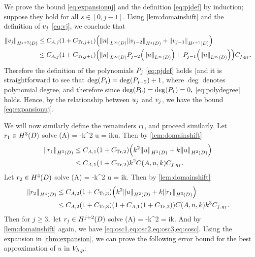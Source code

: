 We prove the bound \cref{eq:expansionuj} and the definition \cref{eq:pjdef} by induction; suppose they hold for all $s \in [0,j-1].$ Using \cref{lem:domainshift} and the definition of $v_{j}$ \cref{eq:vj}, we conclude that
\begin{align*}
\NHfn{j+2}{D}{\vj} &\leq \CAj \mleft(1+\CTrjpo\mright)\mleft(\NLiD{n} \NHfn{j}{D}{\vfn{j-2}} + \NHfn{j+1}{D}{\vfn{j-1}}\mright)\\
&\leq \CAj \mleft(1+\CTrjpo\mright)\mleft(\NLiD{n} \Pfn{j-2}\mleft(\NLiD{n}\mright) + \Pfn{j-1}\mleft(\NLiD{n}\mright)\mright)\Cfg.
\end{align*}
Therefore the definition of the polynomials $P_{j}$ \cref{eq:pjdef} holds (and it is straightforward to see that $\deg\mleft(\Pj\mright) = \deg\mleft(\Pfn{j-2}\mright)+1$, where $\deg$ denotes polynomial degree, and therefore since $\deg\mleft(\Pfn{0}\mright) = \deg\mleft(\Pfn{1}\mright)=0,$ \cref{eq:polydegree} holds. Hence, by the relationship between $u_{j}$ and $v_{j}$, we have the bound \cref{eq:expansionuj}.

We will now similarly define the remainders $r_{l}$, and proceed similarly.
Let $\ro \in \HthD$ solve
\beqs
\grad \cdot \mleft(A\grad \ro\mright) = -k^2 u
\eeqs
\beqs
\dn \ro = iku.
\eeqs
Then by \cref{lem:domainshift}
\begin{align*}
\NHthD{\ro} &\leq \CAo\mleft(1+\CTrt\mright)\mleft(k^2\NHoD{u} + k\NHtD{u}\mright)\\
&\leq \CAo\mleft(1+\CTrt\mright)k^2\CAnk\Cfg.
\end{align*}
Let $\rt \in \HfD$ solve
\beqs
\grad \cdot \mleft(A\grad \rt\mright) = -k^2 u
\eeqs
\beqs
\dn \rt = ik\ro.
\eeqs
Then by \cref{lem:domainshift}
\begin{align*}
\NHfD{\rt} &\leq \CAt\mleft(1+\CTrth\mright)\mleft(k^2\NHtD{u} + k\NHthD{\ro}\mright)\\
&\leq \CAt\mleft(1+\CTrth\mright)\mleft(1 + \CAo\mleft(1+\CTrt\mright)\mright)\CAnk k^3\Cfg.
\end{align*}
Then for $j \geq 3,$ let $\rj \in \HjptD$ solve
\beqs
\grad \cdot \mleft(A\grad \rt\mright) = -k^2 \rjmt
\eeqs
\beqs
\dn \rj = ik\rjmo.
\eeqs
And by \cref{lem:domainshift} again, we have \cref{eq:osc1,eq:osc2,eq:osc3,eq:cosc}.
\epf
Using the expansion in \cref{thm:expansion}, we can prove the following error bound for the best approximation of $u$ in $V_{h,p}$:

